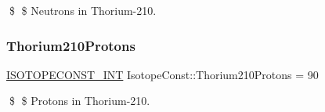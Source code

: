 \$ \$ Neutrons in Thorium-\/210. \mbox{\label{group___isotope_const-_thorium-_th210_ga1d0c13da818af042f1921761e0fce235}} 
\subsubsection{\texorpdfstring{Thorium210\+Protons}{Thorium210Protons}}
{\footnotesize\ttfamily \mbox{\hyperlink{group___isotope_const-_macros_ga5f18360b3e99483a35c32d789e62621c}{I\+S\+O\+T\+O\+P\+E\+C\+O\+N\+S\+T\+\_\+\+I\+NT}} Isotope\+Const\+::\+Thorium210\+Protons = 90}

\$ \$ Protons in Thorium-\/210. 